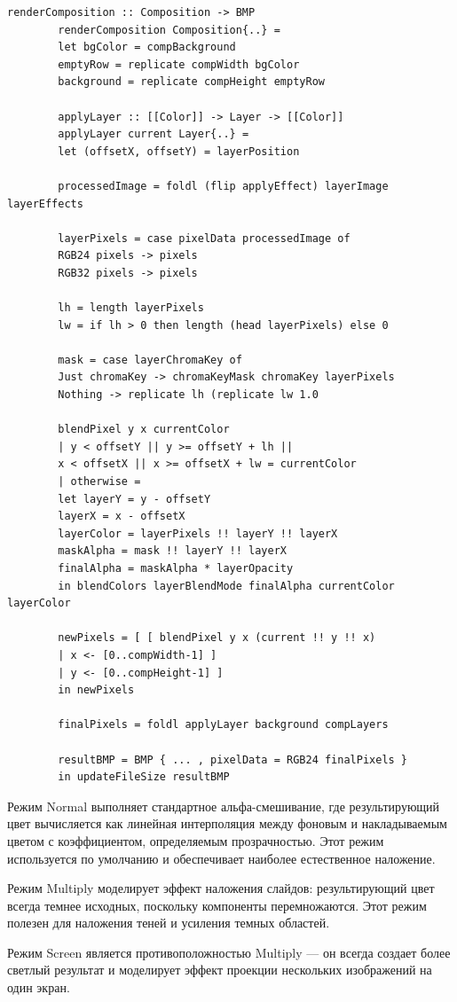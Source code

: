\documentclass[a4paper,12pt]{article}
\begin{document}
	\begin{lstlisting}[caption=Алгоритм рендеринга композиции, label=lst:render-algorithm]
		renderComposition :: Composition -> BMP
		renderComposition Composition{..} =
		let bgColor = compBackground
		emptyRow = replicate compWidth bgColor
		background = replicate compHeight emptyRow
		
		applyLayer :: [[Color]] -> Layer -> [[Color]]
		applyLayer current Layer{..} =
		let (offsetX, offsetY) = layerPosition
		
		processedImage = foldl (flip applyEffect) layerImage layerEffects
		
		layerPixels = case pixelData processedImage of
		RGB24 pixels -> pixels
		RGB32 pixels -> pixels
		
		lh = length layerPixels
		lw = if lh > 0 then length (head layerPixels) else 0
		
		mask = case layerChromaKey of
		Just chromaKey -> chromaKeyMask chromaKey layerPixels
		Nothing -> replicate lh (replicate lw 1.0
		
		blendPixel y x currentColor
		| y < offsetY || y >= offsetY + lh ||
		x < offsetX || x >= offsetX + lw = currentColor
		| otherwise =
		let layerY = y - offsetY
		layerX = x - offsetX
		layerColor = layerPixels !! layerY !! layerX
		maskAlpha = mask !! layerY !! layerX
		finalAlpha = maskAlpha * layerOpacity
		in blendColors layerBlendMode finalAlpha currentColor layerColor
		
		newPixels = [ [ blendPixel y x (current !! y !! x)
		| x <- [0..compWidth-1] ]
		| y <- [0..compHeight-1] ]
		in newPixels
		
		finalPixels = foldl applyLayer background compLayers
		
		resultBMP = BMP { ... , pixelData = RGB24 finalPixels }
		in updateFileSize resultBMP
	\end{lstlisting}
	
	Режим Normal выполняет стандартное альфа-смешивание, где результирующий цвет вычисляется как линейная интерполяция между фоновым и накладываемым цветом с коэффициентом, определяемым прозрачностью. Этот режим используется по умолчанию и обеспечивает наиболее естественное наложение.
	
	Режим Multiply моделирует эффект наложения слайдов: результирующий цвет всегда темнее исходных, поскольку компоненты перемножаются. Этот режим полезен для наложения теней и усиления темных областей.
	
	Режим Screen является противоположностью Multiply — он всегда создает более светлый результат и моделирует эффект проекции нескольких изображений на один экран.
	
\end{document}

